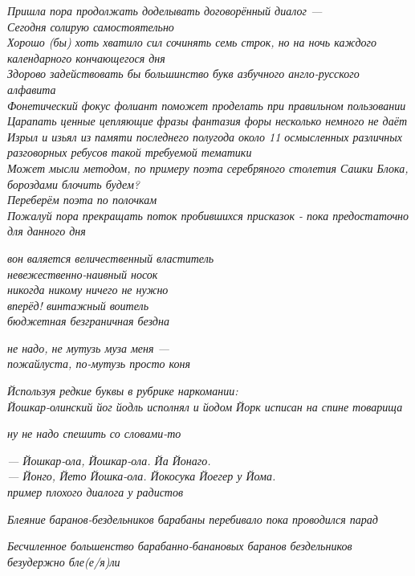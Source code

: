 \begin{flushleft}
    \emph{Пришла пора продолжать доделывать договорённый диалог ---\\
        Сегодня солирую самостоятельно\\
        Хорошо (бы) хоть хватило сил сочинять семь строк, но на ночь каждого календарного кончающегося дня\\
        Здорово задействовать бы большинство букв азбучного англо-русского алфавита\\
        Фонетический фокус фолиант поможет проделать при правильном пользовании\\
        Царапать ценные цепляющие фразы фантазия форы несколько немного не даёт\\
        Изрыл и изьял из памяти последнего полугода около 11 осмысленных различных разговорных ребусов такой требуемой тематики\\
        Может мысли методом, по примеру поэта серебряного столетия Сашки Блока, бороздами блочить будем?\\
        Переберём поэта по полочкам\\
        Пожалуй пора прекращать поток пробившихся присказок - пока предостаточно для данного дня}

    \emph{вон валяется величественный властитель\\
        невежественно-наивный носок\\
        никогда никому ничего не нужно\\
        вперёд! винтажный воитель\\
        бюджетная безграничная бездна}

    \emph{не надо, не мутузь муза меня ---\\
        пожайлуста, по-мутузь просто коня}

    \emph{Йспользуя редкие буквы в рубрике наркомании:\\
    Йошкар-олинский йог йодль исполнял и йодом Йорк исписан на спине товарища}

    \emph{ну не надо спешить со словами-то}

    \emph{--- Йошкар-ола, Йошкар-ола. Йа Йонаго.\\
        --- Йонго, Йето Йошка-ола. Йокосука Йоегер у Йома.\\
        пример плохого диалога у радистов}

    \emph{Блеяние баранов-бездельников барабаны перебивало пока проводился парад}

    \emph{Бесчиленное большенство барабанно-банановых баранов бездельников безудержно бле(е/я)ли}


\end{flushleft}
